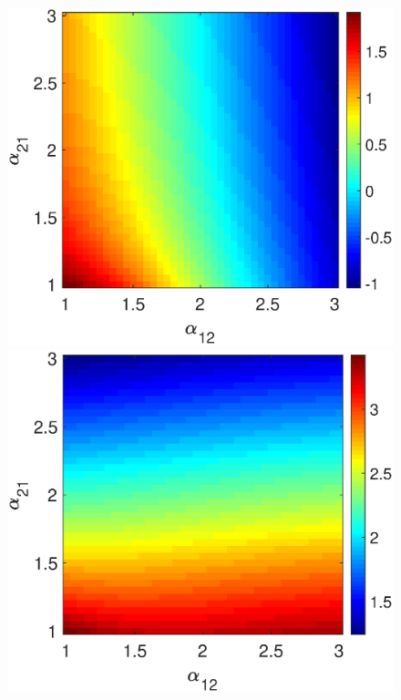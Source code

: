 \begin{figure}[h]
  \begin{minipage}{0.32\linewidth}
  \begin{center}
\includegraphics[width=1\linewidth]{Images/photo22_1.eps}
\end{center}
  \end{minipage} 
  \begin{minipage}{0.32\linewidth}
  \begin{center}
\includegraphics[width=1\linewidth]{Images/photo22_2.eps}
\end{center}


\end{minipage}
\end{figure}
